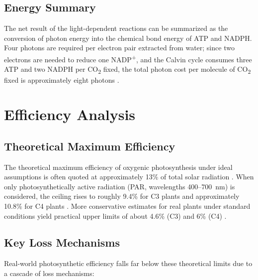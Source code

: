 \documentclass[conference]{IEEEtran}
\begin{document}
\subsection{Energy Summary}
The net result of the light-dependent reactions can be summarized as the conversion of photon energy into the chemical bond energy of ATP and NADPH. Four photons are required per electron pair extracted from water; since two electrons are needed to reduce one NADP\textsuperscript{+}, and the Calvin cycle consumes three ATP and two NADPH per CO\textsubscript{2} fixed, the total photon cost per molecule of CO\textsubscript{2} fixed is approximately eight photons \cite{ripe_pdf}.

\section{Efficiency Analysis}

\subsection{Theoretical Maximum Efficiency}
The theoretical maximum efficiency of oxygenic photosynthesis under ideal assumptions is often quoted at approximately 13\% of total solar radiation \cite{academia_max}. When only photosynthetically active radiation (PAR, wavelengths 400--700~nm) is considered, the ceiling rises to roughly 9.4\% for C3 plants and approximately 10.8\% for C4 plants \cite{ripe_pdf}. More conservative estimates for real plants under standard conditions yield practical upper limits of about 4.6\% (C3) and 6\% (C4) \cite{academia_max, oamonitor}.

\subsection{Key Loss Mechanisms}
Real-world photosynthetic efficiency falls far below these theoretical limits due to a cascade of loss mechanisms:
\end{document}
